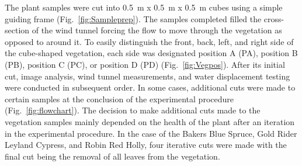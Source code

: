 \documentclass[12pt]{article}
\begin{document}
The plant samples were cut into 0.5~\si{m} x 0.5~\si{m} x 0.5~\si{m} cubes using a simple guiding frame  (Fig.~\ref{fig:Sampleprep}). The samples completed filled the cross-section of the wind tunnel forcing the flow to move through the vegetation as opposed to around it. To easily distinguish the front, back, left, and right side of the cube-shaped vegetation, each side was designated position A (PA), position B (PB), position C (PC), or position D (PD) (Fig.~\ref{fig:Vegpos}). After its initial cut, image analysis, wind tunnel measurements, and water displacement testing were conducted in subsequent order. In some cases, additional cuts were made to certain samples at the conclusion of the experimental procedure (Fig.~\ref{fig:flowchart}). The decision to make additional cuts made to the vegetation samples mainly depended on the health of the plant after an iteration in the experimental procedure. In the case of the Bakers Blue Spruce, Gold Rider Leyland Cypress, and Robin Red Holly, four iterative cuts were made with the final cut being the removal of all leaves from the vegetation.
\end{document}
